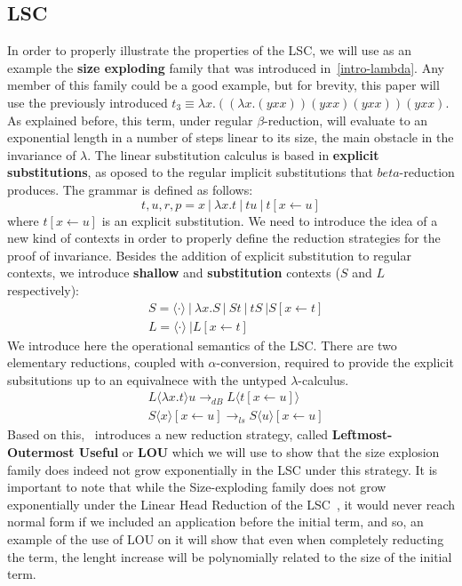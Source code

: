 \documentclass[12pt]{article}
\begin{document}
\subsection{LSC}
In order to properly illustrate the properties of the LSC, we will use as an example the \textbf{size exploding} family that was introduced in~\ref{intro-lambda}. Any member of this family could be a good example, but for brevity, this paper will use the previously introduced $t_{3} \equiv \lambda x.((\lambda x. (yxx))(yxx)(yxx))(yxx)$. As explained before, this term, under regular $\beta$-reduction, will evaluate to an exponential length in a number of steps linear to its size, the main obstacle in the invariance of $\lambda$.
The linear substitution calculus is based in \textbf{explicit substitutions}, as oposed to the regular implicit substitutions that $beta$-reduction produces. The grammar is defined as follows:
\begin{equation}
  t, u, r, p = x \ | \ \lambda x.t \ | \ tu \ | \ t[x \leftarrow u]
\end{equation}
where $t[x \leftarrow u]$ is an explicit substitution.
We need to introduce the idea of a new kind of contexts in order to properly define the reduction strategies for the proof of invariance. Besides the addition of explicit substitution to regular contexts, we introduce \textbf{shallow} and \textbf{substitution} contexts ($S$ and $L$ respectively):
\begin{equation}
  \begin{split}
    &S = \langle \cdot \rangle \ | \ \lambda x.S \ | \ St \ | \ tS \ | S[x \leftarrow t] \\
    &L = \langle \cdot \rangle \ | L[x \leftarrow t]
  \end{split}
\end{equation}
We introduce here the operational semantics of the LSC. There are two elementary reductions, coupled with $\alpha$-conversion, required to provide the explicit subsitutions up to an equivalnece with the untyped $\lambda$-calculus.
\begin{equation}
  \begin{split}
    &L \langle \lambda x .t \rangle u \rightarrow_{dB} L \langle t [x \leftarrow u] \rangle \\
    &S \langle x \rangle [x \leftarrow u] \rightarrow_{ls} S \langle u \rangle [x \leftarrow u]
  \end{split}
\end{equation}
Based on this,~\cite{beta-invariance} introduces a new reduction strategy, called \textbf{Leftmost-Outermost Useful} or \textbf{LOU} which we will use to show that the size explosion family does indeed not grow exponentially in the LSC under this strategy. It is important to note that while the Size-exploding family does not grow exponentially under the Linear Head Reduction of the LSC~\cite{invariance-of-cost-model}, it would never reach normal form if we included an application before the initial term, and so, an example of the use of LOU on it will show that even when completely reducting the term, the lenght increase will be polynomially related to the size of the initial term.
\end{document}
